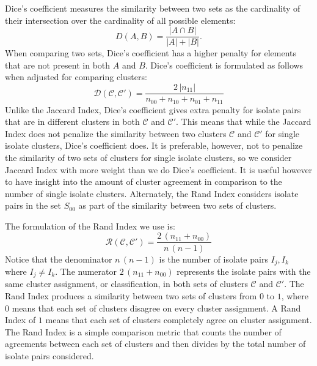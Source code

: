 \documentclass[12pt]{ucthesis}
\begin{document}
      Dice's coefficient measures the similarity between two sets as the
      cardinality of their intersection over the cardinality of all possible
      elements:
      $$D(A, B) = \frac{|A\cap B|}{|A| + |B|}.$$
      When comparing two sets, Dice's coefficient has a higher penalty for
      elements that are not present in both $A$ and $B$. Dice's coefficient is
      formulated as follows when adjusted for comparing clusters:
      $$
         \mathcal{D}(\mathcal{C}, \mathcal{C}') =
         \frac{2\,|n_{11}|}{n_{00} + n_{10} + n_{01} + n_{11}}
      $$
      Unlike the Jaccard Index, Dice's coefficient gives extra penalty for
      isolate pairs that are in different clusters in both $\mathcal{C}$ and
      $\mathcal{C}'$. This means that while the Jaccard Index does not penalize
      the similarity between two clusters $\mathcal{C}$ and $\mathcal{C}'$ for
      single isolate clusters, Dice's coefficient does. It is preferable,
      however, not to penalize the similarity of two sets of clusters for
      single isolate clusters, so we consider Jaccard Index with more weight
      than we do Dice's coefficient. It is useful however to have insight into
      the amount of cluster agreement in comparison to the number of single
      isolate clusters. Alternately, the Rand Index considers isolate pairs in
      the set $S_{00}$ as part of the similarity between two sets of clusters.

      The formulation of the Rand Index we use is:
      $$
         \mathcal{R}(\mathcal{C}, \mathcal{C}') =
         \frac{2\,(n_{11} + n_{00})}{n\,(n-1)}
      $$
      Notice that the denominator $n\,(n - 1)$ is the number of isolate pairs
      $I_{j}, I_{k}$ where $I_{j} \not= I_{k}$. The numerator $2\,(n_{11} +
      n_{00})$ represents the isolate pairs with the same cluster assignment,
      or classification, in both sets of clusters $\mathcal{C}$ and
      $\mathcal{C}'$. The Rand Index produces a similarity between two sets of
      clusters from $0$ to $1$, where $0$ means that each set of clusters
      disagree on every cluster assignment. A Rand Index of $1$ means that each
      set of clusters completely agree on cluster assignment. The Rand Index is
      a simple comparison metric that counts the number of agreements between
      each set of clusters and then divides by the total number of isolate
      pairs considered.
\end{document}
